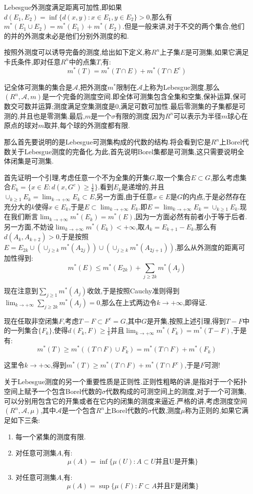 Lebesgue外测度满足距离可加性,即如果$d(E_1,E_2)=\inf\{d(x,y):x\in E_1,y\in E_2\}>0$,那么有$m^*(E_1\cup E_2)=m^*(E_1)+m^*(E_2)$.但是一般来讲,对于不交的两个集合,他们的并的外测度未必是他们分别外测度的和.

按照外测度可以诱导完备的测度,给出如下定义,称$R^n$上子集$E$是可测集,如果它满足卡氏条件,即对任意$R^n$中的点集$T$,有:
$$m^*(T)=m^*(T\cap E)+m^*(T\cap E^c)$$

记全体可测集的集合是$\mathscr{A}$,把外测度$m^*$限制在$\mathscr{A}$上称为Lebesgue测度,那么$(R^n,\mathscr{A},m)$是一个完备的测度空间.即全体可测集包含全集和空集,保补运算,保可数交可数并运算;测度满足空集测度是0,满足可数可加性.最后零测集的子集都是可测的,并且也是零测集.最后,$m$是一个$\sigma$有限的测度,因为$R^n$可以表示为半径$m$球心在原点的球对$m$取并,每个球的外测度都有限.

那么首先要说明的是Lebesgue可测集构成的代数的结构.将会看到它是$R^n$上Borel代数关于Lebesgue测度的完备化.为此,首先说明Borel集都是可测集,这只需要说明全体闭集是可测集.

首先证明一个引理,考虑任意一个不为全集的开集$G$,取一个集合$E\subset G$,那么考虑集合$E_k=\{x\in E:d(x,G^c)\ge\frac{1}{k}\}$.看到$E_k$是递增的,并且$\cup_{k\ge1}E_k=\lim_{k\to+\infty}E_k\subset E$,另一方面,由于任意$x\in E$是$G$的内点,于是必然存在充分大的$k$使得$x\in E_k$,于是$E\subset\lim_ {k\to+\infty}E_k$.即$E=\lim_{k\to+\infty}E_k=\cup_{k\ge1}E_k$.现在我们断言$\lim_{k\to+\infty}m^*(E_k)=m^*(E)$,因为一方面必然有前者小于等于后者.另一方面,不妨设$\lim_ {k\to+\infty}m^*(E_k)<+\infty$,取$A_k=E_{k+1}-E_k$,那么有$d(A_ {k},A_{k+2})>0$,于是按照$E=E_{2k}\cup\left(\cup_{j\ge k}m^*(A_{2j})\right)\cup\left(\cup_{j\ge k}m^*(A_{2j+1})\right)$,那么从外测度的距离可加性得到:
$$m^*(E)\le m^*(E_{2k})+\sum_{j\ge 2k}m^*(A_j)$$

现在注意到$\sum_{j\ge 1}m^*(A_j)$收敛,于是按照Cauchy准则得到$\lim_ {k\to+\infty}\sum_ {j\ge 2k}m^*(A_j)=0$,那么在上式两边令$k\to+\infty$,即得证.

现在任取非空闭集$F$,考虑$T-F\subset F^c=G$,其中$G$是开集,按照上述引理,得到$T-F$中的一列集合$\{F_k\}$,使得$d(F_k,F)\ge\frac{1}{k}$并且$\lim_ {k\to+\infty}m^*(F_k)=m^*(T-F)$,于是有:
$$m^*(T)\ge m^*((T\cap F)\cup F_k)=m^*(T\cap F)+m^*(F_k)$$

这里令$k\to+\infty$,得到$m^*(T)\ge m^*(T\cap F)+m^*(T\cap F^c)$,于是$F$可测!

关于Lebesgue测度的另一个重要性质是正则性.正则性粗略的讲,是指对于一个拓扑空间上赋予一个包含Borel代数的$\sigma$代数构成的可测空间上的测度,对于一个可测集,可以分别用包含它的开集或者在它内的闭集的测度来逼近.严格的讲,考虑测度空间$(R^n,\mathscr{A},\mu)$,其中$\mathscr{A}$是一个包含$R^n$上Borel代数的$\sigma$代数,测度$\mu$称为正则的,如果它满足如下三条:
\begin{enumerate}
  \item 每一个紧集的测度有限.
  \item 对任意可测集$A$,有:
  $$\mu(A)=\inf\{\mu(U):A\subset U\text{并且U是开集}\}$$
  \item 对任意可测集$A$,有:
  $$\mu(A)=\sup\{\mu(F):F\subset A\text{并且F是闭集}\}$$
\end{enumerate}

